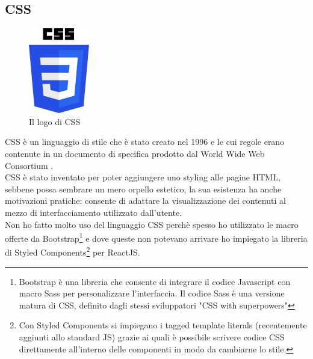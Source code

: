\subsection{CSS}
\begin{figure}[h]
    \centering
    \includegraphics[width=100px]{./images/CSS.png}
    \caption{Il logo di CSS}
    \label{fig:CSS}
\end{figure}
CSS è un linguaggio di stile che è stato creato nel 1996 e le cui regole erano contenute in un documento di specifica prodotto dal World Wide Web Consortium \cite{CSSDef}.
\\
CSS è stato inventato per poter aggiungere uno styling alle pagine HTML, sebbene possa sembrare un mero orpello estetico, la sua esistenza ha anche motivazioni pratiche: consente di adattare la visualizzazione dei contenuti al mezzo di interfacciamento utilizzato dall'utente.
\\
Non ho fatto molto uso del linguaggio CSS perchè spesso ho utilizzato le macro offerte da Bootstrap\footnote{
Bootstrap è una libreria che consente di integrare il codice Javascript con macro Sass per personalizzare l'interfaccia. Il codice Sass è una versione matura di CSS, definito dagli stessi sviluppatori "CSS with superpowers"\cite{SassDef}
}
e dove queste non potevano arrivare ho impiegato la libreria di Styled Components\footnote{
Con Styled Components si impiegano i tagged template literals (recentemente aggiunti allo standard JS) grazie ai quali è possibile scrivere codice CSS direttamente all'interno delle componenti in modo da cambiarne lo stile.\cite{StyledComponentsDef}
} per ReactJS.



